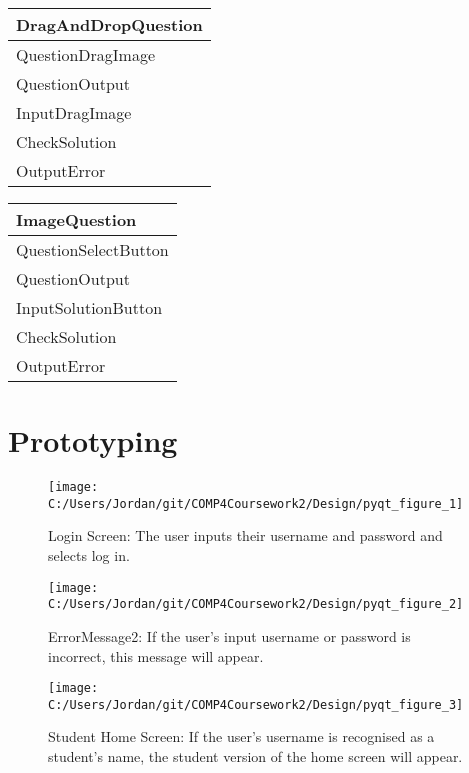 \begin{center}
\begin{tabular}{|p{5cm}|} \hline
DragAndDropQuestion \\ \hline
QuestionDragImage \\ 
QuestionOutput \\ \hline
InputDragImage \\ 
CheckSolution \\
OutputError \\ \hline
\end{tabular}
\end{center}

\begin{center}
\begin{tabular}{|p{5cm}|} \hline
ImageQuestion \\ \hline
QuestionSelectButton \\ 
QuestionOutput \\ \hline
InputSolutionButton \\ 
CheckSolution \\
OutputError \\ \hline
\end{tabular}
\end{center}

\section{Prototyping}

\begin{figure}[H]
    \label{fig:print_function_result}\caption{Login Screen: The user inputs their username and password and selects log in.}
    \texttt{[image: C:/Users/Jordan/git/COMP4Coursework2/Design/pyqt\_figure\_1]}
\end{figure}

\begin{figure}[H]
    \label{fig:print_function_result}\caption{ErrorMessage2: If the user's input username or password is incorrect, this message will appear.}
    \texttt{[image: C:/Users/Jordan/git/COMP4Coursework2/Design/pyqt\_figure\_2]}
\end{figure}

\begin{figure}[H]
    \label{fig:print_function_result}\caption{Student Home Screen: If the user's username is recognised as a student's name, the student version of the home screen will appear.}
    \texttt{[image: C:/Users/Jordan/git/COMP4Coursework2/Design/pyqt\_figure\_3]}
\end{figure}

